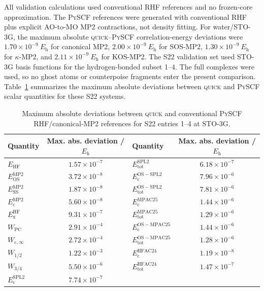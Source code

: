\documentclass[aip,jcp,reprint,superscriptaddress]{revtex4-2}
\newcommand{\quick}{\textsc{quick}}
\newcommand{\pyscf}{\textsc{PySCF}}
\newcommand{\Eh}{E_{\mathrm{h}}}
\newcommand{\EHF}{E_{\mathrm{HF}}}
\newcommand{\EMPtwo}{E_{\mathrm{c}}^{\mathrm{MP2}}}
\newcommand{\ExHF}{E_{\mathrm{x}}^{\mathrm{HF}}}
\newcommand{\Wcinf}{W_{\mathrm{c},\infty}}
\newcommand{\Whalf}{W_{1/2}}
\newcommand{\Wthreeq}{W_{3/4}}
\begin{document}
All validation calculations used conventional RHF references and no frozen-core approximation.  The \pyscf{} references were generated with conventional RHF plus explicit AO-to-MO MP2 contractions, not density fitting.\cite{Sun2018,Sun2020}  For water/STO-3G, the maximum absolute \quick{}--\pyscf{} correlation-energy deviations were \(1.70\times10^{-9}\ \Eh\) for canonical MP2, \(2.00\times10^{-9}\ \Eh\) for SOS-MP2, \(1.30\times10^{-9}\ \Eh\) for \(\kappa\)-MP2, and \(2.11\times10^{-9}\ \Eh\) for KOS-MP2.  The S22 validation set used STO-3G basis functions for the hydrogen-bonded subset 1--4.\cite{Jurecka2006}  The full complexes were used, so no ghost atoms or counterpoise fragments enter the present comparison.  Table~\ref{tab:validation} summarizes the maximum absolute deviations between \quick{} and \pyscf{} scalar quantities for these S22 systems.

\begin{table}[t]
\caption{Maximum absolute deviations between \quick{} and conventional \pyscf{} RHF/canonical-MP2 references for S22 entries 1--4 at STO-3G.}
\label{tab:validation}
\begin{ruledtabular}
\begin{tabular}{lclc}
Quantity & Max. abs. deviation / \(\Eh\) & Quantity & Max. abs. deviation / \(\Eh\) \\
\hline
\(\EHF\) & \(1.57\times10^{-7}\) &
\(E_{\mathrm{tot}}^{\mathrm{SPL2}}\) & \(6.18\times10^{-7}\) \\
\(E_{\mathrm{OS}}^{\mathrm{MP2}}\) & \(3.72\times10^{-8}\) &
\(E_{\mathrm{c}}^{\mathrm{OS-SPL2}}\) & \(7.96\times10^{-6}\) \\
\(E_{\mathrm{SS}}^{\mathrm{MP2}}\) & \(1.87\times10^{-8}\) &
\(E_{\mathrm{tot}}^{\mathrm{OS-SPL2}}\) & \(7.81\times10^{-6}\) \\
\(\EMPtwo\) & \(5.60\times10^{-8}\) &
\(E_{\mathrm{c}}^{\mathrm{MPAC25}}\) & \(1.44\times10^{-6}\) \\
\(\ExHF\) & \(9.31\times10^{-7}\) &
\(E_{\mathrm{tot}}^{\mathrm{MPAC25}}\) & \(1.29\times10^{-6}\) \\
\(W_{\mathrm{PC}}\) & \(2.91\times10^{-4}\) &
\(E_{\mathrm{c}}^{\mathrm{OS-MPAC25}}\) & \(1.44\times10^{-6}\) \\
\(\Wcinf\) & \(2.72\times10^{-4}\) &
\(E_{\mathrm{tot}}^{\mathrm{OS-MPAC25}}\) & \(1.28\times10^{-6}\) \\
\(\Whalf\) & \(1.22\times10^{-3}\) &
\(E_{\mathrm{c}}^{\mathrm{HFAC24}}\) & \(1.19\times10^{-8}\) \\
\(\Wthreeq\) & \(5.50\times10^{-6}\) &
\(E_{\mathrm{tot}}^{\mathrm{HFAC24}}\) & \(1.47\times10^{-7}\) \\
\(E_{\mathrm{c}}^{\mathrm{SPL2}}\) & \(7.74\times10^{-7}\) &
 & \\
\end{tabular}
\end{ruledtabular}
\end{table}
\end{document}
